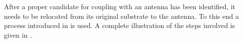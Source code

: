 			After a proper candidate for coupling with an antenna has been identified, it needs to be relocated from its original substrate to the antenna. To this end a \pp process introduced in  is used. A complete illustration of the steps involved is given in .

			\begin{figure}[htp]
				\begin{subfigure}[t]{ 0.49\linewidth}
					\centering
					\caption{}
					\label{subfig::pp_target_antenna}
				\end{subfigure}
				\hfill
				\begin{subfigure}[t]{ 0.49\linewidth}
					\centering

\end{subfigure}
\end{figure}
